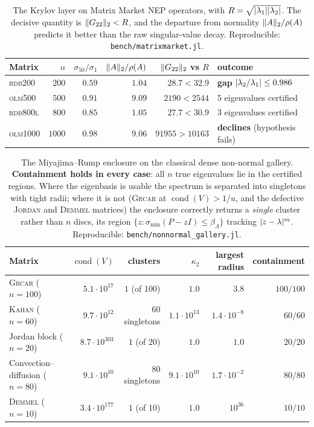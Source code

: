 \documentclass[11pt]{article}
\newcommand{\sigmin}{\sigma_{\min}}
\DeclarePairedDelimiter{\norm}{\lVert}{\rVert}
\DeclarePairedDelimiter{\abs}{\lvert}{\rvert}
\begin{document}
\begin{table}[t]\centering\small
\begin{tabular}{@{}lrrrrl@{}}
\toprule
Matrix & $n$ & $\sigma_{50}/\sigma_1$ & $\norm{A}_2/\rho(A)$ & $\norm{G_{22}}_2$ vs $R$ & outcome \\
\midrule
\textsc{rdb200}  & $200$  & $0.59$ & $1.04$ & $28.7<32.9$   & \textbf{gap} $\abs{\lambda_2/\lambda_1}\le0.986$ \\
\textsc{olm500}  & $500$  & $0.91$ & $9.09$ & $2190<2544$   & $5$ eigenvalues certified \\
\textsc{rdb800l} & $800$  & $0.85$ & $1.05$ & $27.7<30.9$   & $3$ eigenvalues certified \\
\textsc{olm1000} & $1000$ & $0.98$ & $9.06$ & $91955>10163$ & \textbf{declines} (hypothesis fails) \\
\bottomrule
\end{tabular}
\caption{The Krylov layer on Matrix Market NEP operators, with
$R=\sqrt{\abs{\lambda_1}\abs{\lambda_2}}$. The decisive quantity is $\norm{G_{22}}_2<R$, and the
departure from normality $\norm{A}_2/\rho(A)$ predicts it better than the raw singular-value decay.
Reproducible: \texttt{bench/matrixmarket.jl}.}
\label{tab:mm}
\end{table}

\begin{table}[t]\centering\small
\begin{tabular}{@{}lrrrrr@{}}
\toprule
Matrix & $\operatorname{cond}(V)$ & clusters & $\kappa_2$ & largest radius & containment \\
\midrule
\textsc{Grcar} ($n{=}100$)       & $5.1\cdot10^{17}$  & $1$ (of 100) & $1.0$              & $3.8$                & $100/100$ \\
\textsc{Kahan} ($n{=}60$)        & $9.7\cdot10^{12}$  & $60$ singletons & $1.1\cdot10^{13}$ & $1.4\cdot10^{-8}$   & $60/60$ \\
Jordan block ($n{=}20$)          & $8.7\cdot10^{303}$ & $1$ (of 20)  & $1.0$              & $1.0$                & $20/20$ \\
Convection--diffusion ($n{=}80$) & $9.1\cdot10^{10}$  & $80$ singletons & $9.1\cdot10^{10}$ & $1.7\cdot10^{-2}$   & $80/80$ \\
\textsc{Demmel} ($n{=}10$)       & $3.4\cdot10^{177}$ & $1$ (of 10)  & $1.0$              & $10^{36}$            & $10/10$ \\
\bottomrule
\end{tabular}
\caption{The Miyajima--Rump enclosure on the classical dense non-normal gallery. \textbf{Containment
holds in every case}: all $n$ true eigenvalues lie in the certified regions. Where the eigenbasis is
usable the spectrum is separated into singletons with tight radii; where it is not
(\textsc{Grcar} at $\operatorname{cond}(V)>1/u$, and the defective \textsc{Jordan} and \textsc{Demmel}
matrices) the enclosure correctly returns a \emph{single} cluster rather than $n$ discs, its region
$\{z:\sigmin(P-zI)\le\beta_\Lambda\}$ tracking $\abs{z-\lambda}^m$. Reproducible:
\texttt{bench/nonnormal\_gallery.jl}.}
\label{tab:gallery}
\end{table}
\end{document}
